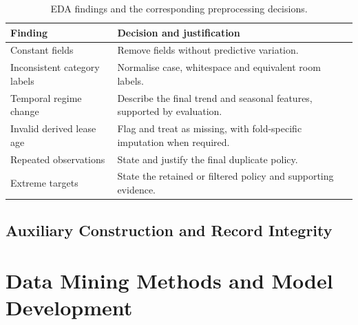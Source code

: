 \documentclass[conference]{IEEEtran}
\newif\ifoutline
\newcommand{\guide}[1]{%
  \ifoutline\par\noindent{\small\color{blue!65!black}%
  \textit{Writing prompt: #1}}\par\fi}
\begin{document}
\begin{table}[t]
  \caption{EDA findings and the corresponding preprocessing decisions.}
  \label{tab:preprocessing}
  \centering
  \small
  \begin{tabularx}{\columnwidth}{p{}X}
    \toprule
    Finding & Decision and justification \\
    \midrule
    Constant fields & Remove fields without predictive variation. \\
    Inconsistent category labels & Normalise case, whitespace and equivalent
    room labels. \\
    Temporal regime change & Describe the final trend and seasonal features,
    supported by evaluation. \\
    Invalid derived lease age & Flag and treat as missing, with fold-specific
    imputation when required. \\
    Repeated observations & State and justify the final duplicate policy. \\
    Extreme targets & State the retained or filtered policy and supporting
    evidence. \\
    \bottomrule
  \end{tabularx}
\end{table}

\subsection{Auxiliary Construction and Record Integrity}
\guide{Describe address-key joins, HDB attributes and spatial distances or
counts. Explain how historical availability was handled for MRT and other
snapshot data. For economic variables, describe aggregation, calendar lags
and information availability. Report verified coverage and missingness for
sources actually used.}
\guide{State the final exact-duplicate and repeated-feature policies. The
current core removes 641 exact repeats and retains 149,359 rows. An earlier
auxiliary file collapsed feature vectors and averaged rents. The corrected
Ridge comparison uses the same individual core rows and original targets.
Report the final policy, preserve comparable evaluation populations, and
explain any weighting if records were aggregated. Do not compare scores
computed against original targets with scores computed against group means.}

\section{Data Mining Methods and Model Development}
\label{sec:methods}
\end{document}
